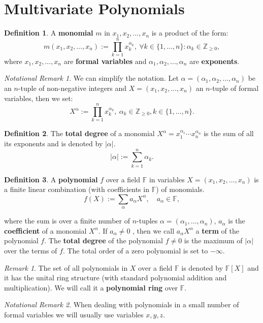 \documentclass[thesis=M,english]{FITthesis}[2012/10/20]
\theoremstyle{remark}
\newtheorem*{RM}{Remark}
\newtheorem*{NRM}{Notational Remark}
\theoremstyle{definition}
\newtheorem{DF}{Definition}[section]
\begin{document}
\section{Multivariate Polynomials}
\begin{DF}
A \textbf{monomial} $m$ in $x_1,x_2,\ldots,x_n$ is a product of the form:
$$
m(x_1,x_2,\ldots,x_n) :=  \prod_{k=1}^nx_k^{\alpha_k},\ \forall k \in \{1, \ldots, n\}: \alpha_k \in\mathbb{Z}_{\geq 0},
$$
where $x_1,x_2,\ldots,x_n$ are \textbf{formal variables} and $\alpha_1,\alpha_2,\ldots,\alpha_n$ are \textbf{exponents}. 
\end{DF}
\begin{NRM} We can simplify the notation. Let $\alpha = (\alpha_1,\alpha_2,\ldots,\alpha_n)$ be an $n$-tuple of non-negative integers and $X = (x_1,x_2,\ldots,x_n)$ an $n$-tuple of formal variables, then we set:
$$
X^\alpha := \prod_{k=1}^nx_k^{\alpha_k},\ \alpha_k \in\mathbb{Z}_{\geq 0}, k \in \{1, \ldots, n\}.
$$
\end{NRM}
\begin{DF}
The \textbf{total degree} of a monomial $X^\alpha=x_1^{\alpha_1}\cdots x_n^{\alpha_n}$ is the sum of all its exponents and is denoted by $|\alpha|$.
$$
|\alpha| := \sum_{k=1}^n \alpha_k.
$$
\end{DF}
\begin{DF}
A \textbf{polynomial}  $f$ over a field $\mathbb{F}$ in variables $X = (x_1,x_2,\ldots,x_n)$ is a finite linear combination (with coefficients in $\mathbb{F}$) of monomials.
$$
f(X) := \sum_{\alpha} a_{\alpha}X^\alpha, \quad a_{\alpha} \in \mathbb{F},
$$
\end{DF}
\noindent where the sum is over a finite number of $n$-tuples $\alpha = (\alpha_1, \ldots, \alpha_n)$, $a_\alpha$ is the \textbf{coefficient} of a monomial $X^\alpha$. If $a_\alpha \neq 0$ , then we call $a_{\alpha}X^\alpha$ a \textbf{term} of the  polynomial $f$. The \textbf{total degree} of the polynomial $f \neq 0$ is the maximum  of $|\alpha |$ over the terms of $f$. The total order of a zero polynomial is set to $-\infty$. 
\begin{RM}
The set of all polynomials in $X$ over a field $\mathbb{F}$ is denoted by $\mathbb{F}[X]$ and it has the unital ring structure (with standard polynomial addition and multiplication). We will call it a \textbf{polynomial ring} over $\mathbb{F}$.
\end{RM}
\begin{NRM}
\noindent When dealing with polynomials in a small number of formal variables we will usually use variables $x,y,z$. 
\end{NRM}
\end{document}

